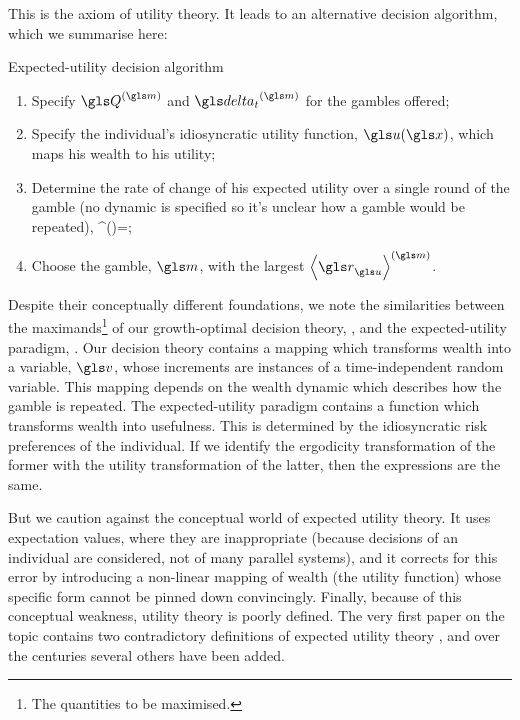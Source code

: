 This is the axiom of utility theory. It leads to an alternative decision algorithm, which we summarise here:
\begin{keypts}{Expected-utility decision algorithm}
\begin{enumerate}
\item Specify $\Q^{(\m)}$ and $\dt^{(\m)}$ for the gambles offered;
\item Specify the individual's idiosyncratic utility function, $\gu(\x)$, which maps his wealth to his utility;
\item Determine the rate of change of his expected utility over a single round of the gamble (no dynamic is specified so it's unclear how a gamble would be repeated),
\be
\ave{\gr_\gu}^{(\m)}=\ave{\frac{\gu\left(\x+\q^{(\m)}\right)-\gu(\x)}{\dt^{(\m)}}};
\ee
\item Choose the gamble, $\m$, with the largest $\ave{\gr_\gu}^{(\m)}$.
\end{enumerate}
\end{keypts}

Despite their conceptually different foundations, we note the similarities between the 
maximands\footnote{The quantities to be maximised.} of our growth-optimal decision 
theory, , and the expected-utility paradigm, . Our decision theory
contains a mapping which transforms wealth into a variable, $\gv$, whose increments are 
instances of a time-independent random variable. This mapping depends on the wealth dynamic which 
describes how the gamble is repeated. The expected-utility paradigm contains a function which transforms 
wealth into usefulness. This is determined by the idiosyncratic risk preferences of 
the individual. If we identify the ergodicity transformation of the former with the 
utility transformation of the latter, then the expressions are the same.

But we caution against the conceptual world of expected utility theory. It uses expectation
values, where they are inappropriate (because decisions of an individual are considered, 
not of many parallel systems), and it corrects for this error by introducing a non-linear 
mapping of wealth (the utility function) whose specific form cannot be pinned down 
convincingly. Finally, because of this conceptual weakness, utility theory is poorly defined. 
The very first paper on the topic contains two contradictory definitions of expected utility 
theory \cite{Bernoulli1738}, and over the centuries several others have been added.

